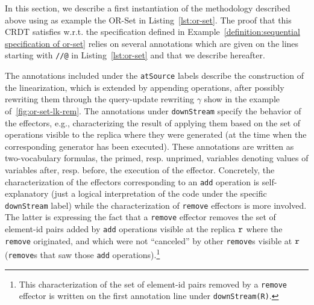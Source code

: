 In this section, we describe a first instantiation of the methodology described above using as example the OR-Set in Listing~\ref{lst:or-set}. The proof that this CRDT satisfies \crdtlin{} w.r.t. the specification defined in Example~\ref{definition:sequential specification of or-set} relies on several annotations which are given on the lines starting with {\tt //@} in Listing~\ref{lst:or-set} and that we describe hereafter.


The annotations included under the \lstinline|atSource| labels describe the construction of the linearization,
which is extended by appending operations, after possibly rewriting
them through the query-update rewriting $\gamma$ show in the example of~\ref{fig:or-set-lk-rem}. %
The annotations under \lstinline|downStream| specify the behavior of the effectors, e.g., characterizing the result of applying them based on the set of operations visible to the replica where they were generated
(at the time when the corresponding generator has been executed). These annotations are written as two-vocabulary formulas, the primed, resp. unprimed, variables denoting values of variables after, resp. before, the execution of the effector. Concretely, the characterization of the effectors corresponding to an {\tt add} operation is self-explanatory (just a logical interpretation of the code under the specific \lstinline|downStream| label) while the characterization of {\tt remove} effectors is more involved. The latter is expressing the fact that 
a {\tt remove} effector removes the set of element-id pairs added by {\tt add} operations visible at the replica $\mathtt{r}$ where the {\tt remove} originated, and which were not ``canceled'' by other {\tt remove}s visible at $\mathtt{r}$ ({\tt remove}s that saw those {\tt add} operations).\footnote{This characterization of the set of element-id pairs removed by a {\tt remove} effector is written on the first annotation line under \lstinline|downStream(R)|.}


